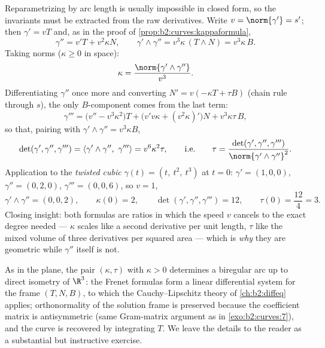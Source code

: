 \begin{example}\label{ex:b2:curves:twistedcubic}
Reparametrizing by arc length is usually impossible in closed
form, so the invariants must be extracted from the raw
derivatives. Write $v = \norm{\gamma'} = s'$; then $\gamma' =
vT$ and, as in the proof of
\cref{prop:b2:curves:kappaformula},
\[
\gamma'' = v'T + v^2\kappa N,
\qquad
\gamma' \wedge \gamma'' = v^3\kappa\,(T \wedge N) =
v^3\kappa\,B .
\]
Taking norms ($\kappa \geq 0$ in space):
\[
\kappa = \frac{\norm{\gamma' \wedge \gamma''}}{v^3} .
\]
Differentiating $\gamma''$ once more and converting $N' =
v(-\kappa T + \tau B)$ (chain rule through $s$), the only
$B$-component comes from the last term:
\[
\gamma''' = \bigl(v'' - v^3\kappa^2\bigr)T +
\bigl(v'v\kappa + (v^2\kappa)'\bigr)N + v^3\kappa\tau\,B,
\]
so that, pairing with $\gamma' \wedge \gamma'' = v^3\kappa B$,
\[
\det(\gamma', \gamma'', \gamma''') = \langle\gamma' \wedge
\gamma'',\ \gamma'''\rangle = v^6\kappa^2\tau,
\qquad\text{i.e.}\qquad
\tau = \frac{\det(\gamma', \gamma'',
\gamma''')}{\norm{\gamma' \wedge \gamma''}^2} .
\]
Application to the \emph{twisted cubic} $\gamma(t) = (t,\
t^2,\ t^3)$ at $t = 0$: $\gamma' = (1, 0, 0)$, $\gamma'' =
(0, 2, 0)$, $\gamma''' = (0, 0, 6)$, so $v = 1$,
\[
\gamma' \wedge \gamma'' = (0, 0, 2), \qquad \kappa(0) = 2,
\qquad
\det(\gamma', \gamma'', \gamma''') = 12, \qquad \tau(0) =
\frac{12}{4} = 3 .
\]
Closing insight: both formulas are ratios in which the speed
$v$ cancels to the exact degree needed --- $\kappa$ scales
like a second derivative per unit length, $\tau$ like the
mixed volume of three derivatives per squared area --- which
is \emph{why} they are geometric while $\gamma''$ itself is
not.
\end{example}

\begin{remark}
As in the plane, the pair $(\kappa, \tau)$ with $\kappa > 0$
determines a biregular arc up to direct isometry of $\R^3$: the
Frenet formulas form a linear differential system for the frame
$(T, N, B)$, to which the Cauchy--Lipschitz theory of
\cref{ch:b2:diffeq} applies; orthonormality of the solution frame
is preserved because the coefficient matrix is antisymmetric (same
Gram-matrix argument as in \cref{exo:b2:curves:7}), and the curve
is recovered by integrating $T$. We leave the details to the
reader as a substantial but instructive exercise.
\end{remark}

